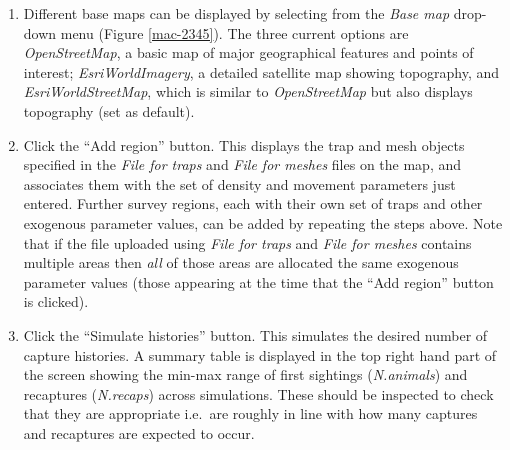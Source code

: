 \documentclass[a4paper,11pt, draft]{article} %
\begin{document}
\begin{enumerate}
\begin{enumerate}
\end{enumerate}
\item Different base maps can be displayed by selecting from the \textit{Base map} drop-down menu (Figure \ref{mac-2345}). The three current options are \textit{OpenStreetMap}, a basic map of major geographical features and points of interest; \textit{EsriWorldImagery}, a detailed satellite map showing topography, and \textit{EsriWorldStreetMap}, which is similar to \textit{OpenStreetMap} but also displays topography (set as default).  
\item Click the ``Add region'' button. This displays the trap and mesh objects specified in the \textit{File for traps} and \textit{File for meshes} files on the map, and associates them with the set of density and movement parameters just entered. Further survey regions, each with their own set of traps and other exogenous parameter values, can be added by repeating the steps above. Note that if the file uploaded using \textit{File for traps} and \textit{File for meshes} contains multiple areas then {\it all} of those areas are allocated the same exogenous parameter values (those appearing at the time that the ``Add region'' button is clicked).
\item Click the ``Simulate histories'' button. This simulates the desired number of capture histories. A summary table is displayed in the top right hand part of the screen showing the min-max range of first sightings (\textit{N.animals}) and recaptures (\textit{N.recaps}) across simulations. These should be inspected to check that they are appropriate i.e.\ are roughly in line with how many captures and recaptures are expected to occur. 

\end{enumerate}
\end{document}
